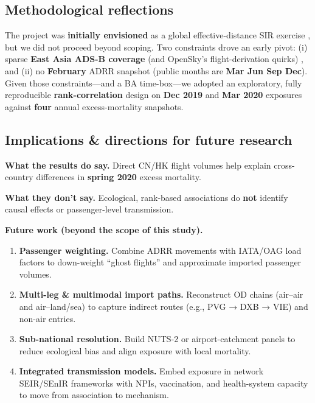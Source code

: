 \documentclass[
  authoryear,
  preprint,
  3p,
  onecolumn]{elsarticle}
\providecommand{\tightlist}{%
  \setlength{\itemsep}{0pt}\setlength{\parskip}{0pt}}\usepackage{longtable,booktabs,array}
\begin{document}
\subsection{Methodological
reflections}\label{methodological-reflections}

The project was \textbf{initially envisioned} as a global
effective-distance SIR exercise \citep{brockmann2013}, but we did not
proceed beyond scoping. Two constraints drove an early pivot: (i) sparse
\textbf{East Asia ADS-B coverage} (and OpenSky's flight-derivation
quirks) \citep{strohmeier2021}, and (ii) no \textbf{February} ADRR
snapshot (public months are \textbf{Mar \textbar{} Jun \textbar{} Sep
\textbar{} Dec}). Given those constraints---and a BA time-box---we
adopted an exploratory, fully reproducible \textbf{rank-correlation}
design on \textbf{Dec 2019} and \textbf{Mar 2020} exposures against
\textbf{four} annual excess-mortality snapshots.

\subsection{Implications \& directions for future
research}\label{implications-directions-for-future-research}

\textbf{What the results do say.} Direct CN/HK flight volumes help
explain cross-country differences in \textbf{spring 2020} excess
mortality.

\textbf{What they don't say.} Ecological, rank-based associations do
\textbf{not} identify causal effects or passenger-level transmission.

\textbf{Future work (beyond the scope of this study).}

\begin{enumerate}
\def\labelenumi{\arabic{enumi}.}
\tightlist
\item
  \textbf{Passenger weighting.} Combine ADRR movements with IATA/OAG
  load factors to down-weight ``ghost flights'' and approximate imported
  passenger volumes.
\item
  \textbf{Multi-leg \& multimodal import paths.} Reconstruct OD chains
  (air--air and air--land/sea) to capture indirect routes (e.g., PVG →
  DXB → VIE) and non-air entries.
\item
  \textbf{Sub-national resolution.} Build NUTS-2 or airport-catchment
  panels to reduce ecological bias and align exposure with local
  mortality.
\item
  \textbf{Integrated transmission models.} Embed exposure in network
  SEIR/SEnIR frameworks with NPIs, vaccination, and health-system
  capacity to move from association to mechanism.
\end{enumerate}
\end{document}

